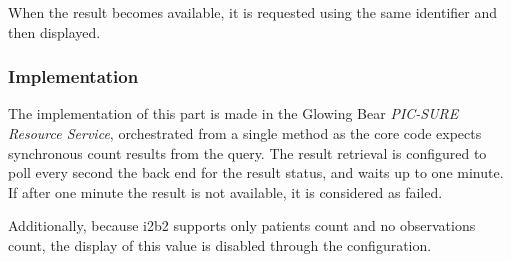 When the result becomes available, it is requested using the same identifier and then displayed.


\subsubsection{Implementation}

The implementation of this part is made in the Glowing Bear \emph{PIC-SURE Resource Service}, orchestrated from a single method as the core code expects synchronous count results from the query.
The result retrieval is configured to poll every second the back end for the result status, and waits up to one minute.
If after one minute the result is not available, it is considered as failed.

Additionally, because i2b2 supports only patients count and no observations count, the display of this value is disabled through the configuration.
